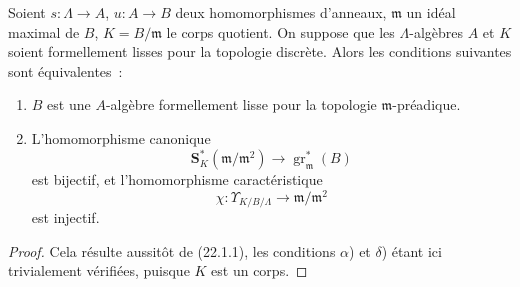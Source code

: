\begin{corollary}[22.1.2]
\label{0.22.1.2-fr}
Soient $s:\Lambda\to A$, $u:A\to B$ deux homomorphismes d'anneaux,
$\mathfrak m$ un idéal maximal de $B$, $K=B/\mathfrak m$ le corps quotient.
On suppose que les $\Lambda$-algèbres $A$ et $K$ soient formellement lisses
pour la topologie discrète. Alors les conditions suivantes sont
équivalentes~:
\begin{enumerate}
  \item[a)] $B$ est une $A$-algèbre formellement lisse pour la topologie
  $\mathfrak m$-préadique.
  \item[b)] L'homomorphisme canonique
  \begin{equation}
  \tag{22.1.2.1}
  \label{0.22.1.2.1-fr}
    \mathbf S_K^*(\mathfrak m/\mathfrak m^2)
    \longrightarrow\operatorname{gr}_{\mathfrak m}^*(B)
  \end{equation}
  est bijectif, et l'homomorphisme caractéristique
  \begin{equation}
  \tag{22.1.2.2}
  \label{0.22.1.2.2-fr}
    \chi:\Upsilon_{K/B/\Lambda}\longrightarrow\mathfrak m/\mathfrak m^2
  \end{equation}
  est injectif.
\end{enumerate}
\end{corollary}

\begin{proof}
Cela résulte aussitôt de (22.1.1), les conditions $\alpha$) et $\delta$)
étant ici trivialement vérifiées, puisque $K$ est un corps.
\end{proof}

